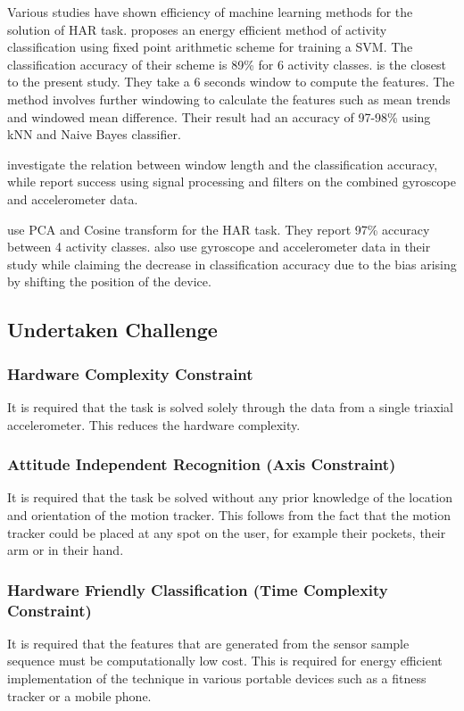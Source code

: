 \documentclass[
10pt,           %
a4paper,        %
oneside,        %
headinclude,footinclude, %
]{scrartcl}
\begin{document}
Various studies have shown efficiency of machine learning methods for the solution of \gls{HAR} task. \cite{Anguita2013} proposes an energy efficient method of activity classification using fixed point arithmetic scheme for training a \gls{SVM}. The classification accuracy of their scheme is 89\% for 6 activity classes. \cite{Gupta2014} is the closest to the present study. They take a 6 seconds window to compute the features. The method involves further windowing to calculate the features such as mean trends and windowed mean difference. Their result had an accuracy of 97-98\% using kNN and Naive Bayes classifier.

\cite{Banos2014} investigate the relation between window length and the classification accuracy, while \cite{Reyes-Ortiz2015} report success using signal processing and filters on the combined gyroscope and accelerometer data.

\cite{He2009} use PCA and Cosine transform for the \gls{HAR} task. They report 97\% accuracy between 4 activity classes. \cite{Shoaib2013} also use gyroscope and accelerometer data in their study while claiming the decrease in classification accuracy due to the bias arising by shifting the position of the device.

\subsection{Undertaken Challenge}
\subsubsection{Hardware Complexity Constraint}
It is required that the task is solved solely through the data from a single triaxial accelerometer. This reduces the hardware complexity.

\subsubsection{Attitude Independent Recognition (Axis Constraint)}
\label{axis_constraint}
It is required that the task be solved without any prior knowledge of the location and orientation of the motion tracker. This follows from the fact that the motion tracker could be placed at any spot on the user, for example their pockets, their arm or in their hand.

\subsubsection{Hardware Friendly Classification (Time Complexity Constraint)}
\label{time_constraint}
It is required that the features that are generated from the sensor sample sequence must be computationally low cost. This is required for energy efficient implementation of the technique in various portable devices such as a fitness tracker or a mobile phone.
\end{document}
